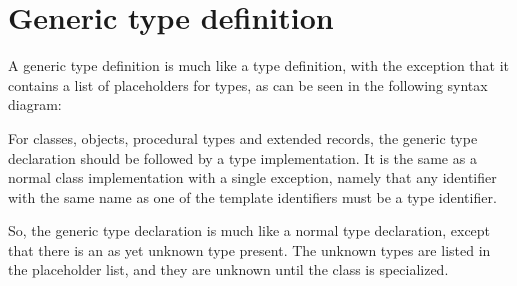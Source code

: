 \section{Generic type definition}
A generic type definition is much like a type definition, with the exception that it contains a list of placeholders for types,
as can be seen in the following syntax diagram:

For classes, objects, procedural types and extended records, the generic
type declaration should be followed by a type implementation.
It is the same as a normal class implementation with a single exception,
namely that any identifier with the same name as one of the template
identifiers must be a type identifier.

So, the generic type declaration is much like a normal type declaration, except that there is an as yet unknown type present.
The unknown types are listed in the placeholder list, and they are unknown until the class is specialized.

